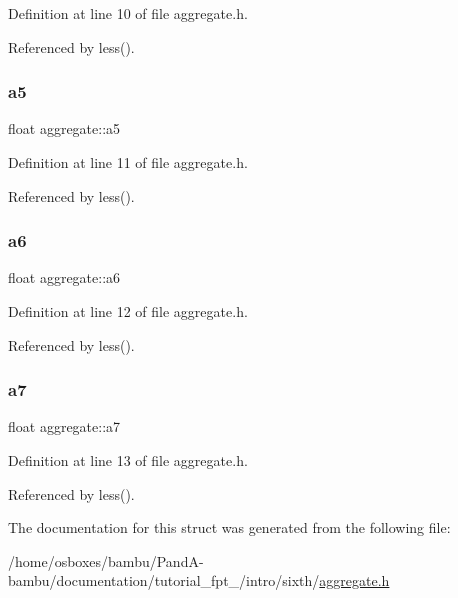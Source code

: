 Definition at line 10 of file aggregate.\+h.



Referenced by less().

\mbox{\label{structaggregate_a11c778cbf47725b761e66de82d41c80a}} 
\subsubsection{\texorpdfstring{a5}{a5}}
{\footnotesize\ttfamily float aggregate\+::a5}



Definition at line 11 of file aggregate.\+h.



Referenced by less().

\mbox{\label{structaggregate_acf18c60ca06522b5e4d39f7c2c2c5035}} 
\subsubsection{\texorpdfstring{a6}{a6}}
{\footnotesize\ttfamily float aggregate\+::a6}



Definition at line 12 of file aggregate.\+h.



Referenced by less().

\mbox{\label{structaggregate_a90c229b52c2d5e61e8fb5427d92c20b7}} 
\subsubsection{\texorpdfstring{a7}{a7}}
{\footnotesize\ttfamily float aggregate\+::a7}



Definition at line 13 of file aggregate.\+h.



Referenced by less().



The documentation for this struct was generated from the following file\+:\begin{DoxyCompactItemize}
\item 
/home/osboxes/bambu/\+Pand\+A-\/bambu/documentation/tutorial\+\_\+fpt\+\_/intro/sixth/\hyperlink{tutorial__fpt__2017_2intro_2sixth_2aggregate_8h}{aggregate.\+h}\end{DoxyCompactItemize}
